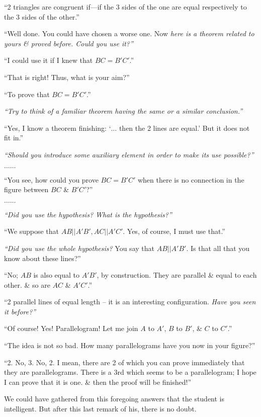 \documentclass[oneside]{book}
\numberwithin{equation}{section}
\begin{document}
``2 triangles are congruent if---if the 3 sides of the one are equal respectively to the 3 sides of the other.''

``Well done. You could have chosen a worse one. Now \textit{here is a theorem related to yours \& proved before. Could you use it?''}

``I could use it if I knew that $BC = B'C'$.''

``That is right! Thus, what is your aim?''

``To prove that $BC = B'C'$.''

\textit{``Try to think of a familiar theorem having the same or a similar conclusion.''}

``Yes, I know a theorem finishing: `$\ldots$ then the 2 lines are equal.' But it does not fit in.''

\textit{``Should you introduce some auxiliary element in order to make its use possible?''}

$\ldots\ldots$

``You see, how could you prove $BC = B'C'$ when there is no connection in the figure between $BC$ \& $B'C'$?''

$\ldots\ldots$

\textit{``Did you use the hypothesis? What is the hypothesis?''}

``We suppose that $AB||A'B',AC||A'C'$. Yes, of course, I must use that.''

\textit{``Did you use the whole hypothesis?} You say that $AB||A'B'$. Is that all that you know about these lines?''

``No; $AB$ is also equal to $A'B'$, by construction. They are parallel \& equal to each other. \& so are $AC$ \& $A'C'$.''

``2 parallel lines of equal length -- it is an interesting configuration. \textit{Have you seen it before?''}

``Of course! Yes! Parallelogram! Let me join $A$ to $A'$, $B$ to $B'$, \& $C$ to $C'$.''

``The idea is not so bad. How many parallelograms have you now in your figure?''

``2. No, 3. No, 2. I mean, there are 2 of which you can prove immediately that they are parallelograms. There is a 3rd which seems to be a parallelogram; I hope I can prove that it is one. \& then the proof will be finished!''

We could have gathered from this foregoing answers that the student is intelligent. But after this last remark of his, there is no doubt.
\end{document}
